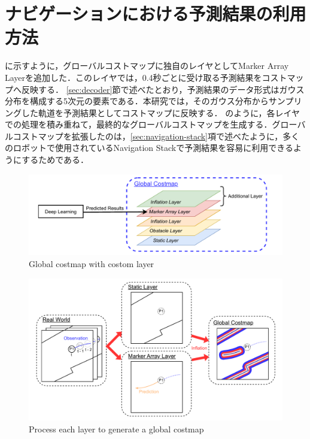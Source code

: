 \section{ナビゲーションにおける予測結果の利用方法}\label{sec:nav-usage}
に示すように，グローバルコストマップに独自のレイヤとしてMarker Array Layerを追加した．このレイヤでは，0.4秒ごとに受け取る予測結果をコストマップへ反映する．
\ref{sec:decoder}節で述べたとおり，予測結果のデータ形式はガウス分布を構成する5次元の要素である．本研究では，そのガウス分布からサンプリングした軌道を予測結果としてコストマップに反映する．
のように，各レイヤでの処理を積み重ねて，最終的なグローバルコストマップを生成する．グローバルコストマップを拡張したのは，\ref{sec:navigation-stack}項で述べたように，多くのロボットで使用されているNavigation Stackで予測結果を容易に利用できるようにするためである．

\begin{figure}[H]
  \centering
 \includegraphics[keepaspectratio, scale=0.65]
      {images/layer.pdf}
\caption{Global costmap with costom layer}
 \label{Fig:global-costmap}
\end{figure} 

\vspace{-20pt}

\begin{figure}[H]
  \centering
 \includegraphics[keepaspectratio, scale=0.45]
      {images/costmap-image.pdf}
\caption{Process each layer to generate a global costmap}
 \label{Fig:costmap-flow}
\end{figure} 


\newpage
